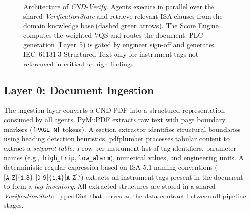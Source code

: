 \documentclass[journal]{IEEEtran}
\newcommand{\sys}{\textit{CND-Verify}}
\begin{document}
\begin{figure}[!t]
{%
}
\caption{Architecture of \sys{}. Agents execute in parallel over the shared
\textit{VerificationState} and retrieve relevant ISA clauses from the domain
knowledge base (dashed green arrows). The Score Engine computes the weighted
VQS and routes the document. PLC generation (Layer~5) is gated by engineer
sign-off and generates IEC~61131-3 Structured Text only for instrument tags
not referenced in critical or high findings.}
\label{fig:arch}
\end{figure}

\subsection{Layer 0: Document Ingestion}

The ingestion layer converts a CND PDF into a structured representation consumed
by all agents. PyMuPDF extracts raw text with page boundary markers
(\texttt{[PAGE~N]} tokens). A section extractor identifies structural boundaries
using heading detection heuristics. pdfplumber processes tabular content to
extract a \textit{setpoint table}: a row-per-instrument list of tag identifiers,
parameter names (e.g.,~\texttt{high\_trip}, \texttt{low\_alarm}), numerical
values, and engineering units. A deterministic regular expression based on
ISA-5.1 naming conventions
($\texttt{[A-Z]\{1,3\}-[0-9]\{1,4\}[A-Z]?}$) extracts all instrument tags
present in the document to form a \textit{tag inventory}. All extracted
structures are stored in a shared \textit{VerificationState} TypedDict that
serves as the data contract between all pipeline stages.
\end{document}

